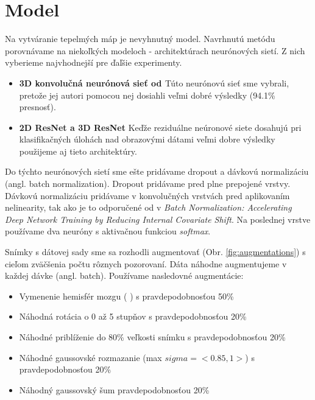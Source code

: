\section{Model \label{sec:design_model}}

Na vytváranie tepelmých máp je nevyhnutný model. Navrhnutú metódu porovnávame na niekoľkých modeloch - architektúrach neurónových sietí. Z nich vyberieme najvhodnejší pre ďaľšie experimenty.

\begin{itemize}
    \item \textbf{3D konvolučná neurónová sieť od \citeauthor*{esmaeilzadeh2018end}} Túto neurónovú sieť sme vybrali, pretože jej autori pomocou nej dosiahli veľmi dobré výsledky (94.1\% presnosť).
    \item \textbf{2D ResNet a 3D ResNet} Keďže reziduálne neúronové siete dosahujú pri klasifikačných úlohách nad obrazovými dátami veľmi dobre výsledky použijeme aj tieto architektúry.
\end{itemize}

Do týchto neurónových sietí sme ešte pridávame dropout a dávkovú normalizáciu (angl. batch normalization). Dropout pridávame pred plne prepojené vrstvy. Dávkovú normalizáciu pridávame v konvolučných vrstvách pred aplikovaním nelinearity, tak ako je to odporučené od \citeauthor*{ioffe2015batch} v \textit{Batch Normalization: Accelerating Deep Network Training by Reducing Internal Covariate Shift}. Na poslednej vrstve používame dva neuróny s aktivačnou funkciou \textit{softmax}.

Snímky s dátovej sady sme sa rozhodli augmentovať (Obr. \ref{fig:augmentations}) s cieľom zväčšenia počtu rôznych pozorovaní. Dáta náhodne augmentujeme v každej dávke (angl. batch). Používame nasledovné augmentácie:

\begin{itemize}
    \item Vymenenie hemisfér mozgu (\citeauthor*{esmaeilzadeh2018end} \cite{esmaeilzadeh2018end}) s pravdepodobnosťou 50\%
    \item Náhodná rotácia o 0 až 5 stupňov s pravdepodobnosťou 20\%
    \item Náhodné priblíženie do 80\% veľkosti snímku s pravdepodobnosťou 20\%
    \item Náhodné gaussovské rozmazanie (max $sigma = <0.85, 1>$) s pravdepodobnosťou 20\%
    \item Náhodný gaussovský šum pravdepodobnosťou 20\%
\end{itemize}

